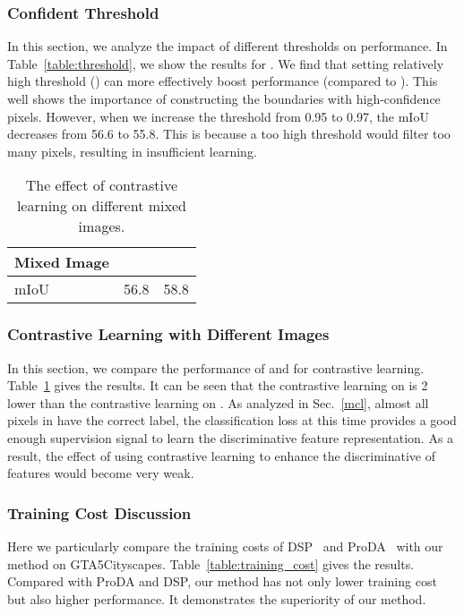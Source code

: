 \documentclass[sigconf]{acmart}
\begin{document}
	\subsubsection{Confident Threshold }
	In this section, we analyze the impact of different thresholds on performance. In Table~\ref{table:threshold}, we show the results for .
	We find that setting relatively high threshold () can more effectively boost performance (compared to ). This well shows the importance of constructing the boundaries with high-confidence pixels. However, when we increase the threshold from 0.95 to 0.97, the mIoU decreases from 56.6 to 55.8. This is because a too high threshold would filter too many pixels, resulting in insufficient learning.
	\begin{table}[h]
		\def\arraystretch{1.4}
		\setlength{\tabcolsep}{7pt}
		\begin{center}
			\caption{The effect of contrastive learning on different mixed images.}
			\vspace{0.5mm}
			\begin{tabular}{lcc} 
				\hline
				
				Mixed Image    &    &   		\\ \toprule 
				mIoU 			& 56.8 	 & 58.8  	\\ \bottomrule
				
			\end{tabular}
			\vspace{0.5mm}
			\label{table:mixed_image}
		\end{center}
		
	\end{table}
	\subsubsection{Contrastive Learning with Different Images}
	In this section, we compare the performance of  and  for contrastive learning. Table~\ref{table:mixed_image} gives the results. It can be seen that the contrastive learning on  is 2  lower than the contrastive learning on . As analyzed in Sec.~\ref{mcl}, almost all pixels in  have the correct label, the classification loss at this time provides a good enough supervision signal to learn the discriminative feature representation. As a result, the effect of using contrastive learning to enhance the discriminative of  features would become very weak. 
	
\subsubsection{Training Cost Discussion}
	Here we particularly compare the training costs of DSP~\cite{gao2021dsp} and ProDA~\cite{zhang2021prototypical} with our method on GTA5Cityscapes.   
	Table~\ref{table:training_cost} gives the results. Compared with ProDA and DSP, our method has not only lower training cost but also higher performance. It demonstrates the superiority of our method.
	
\end{document}
